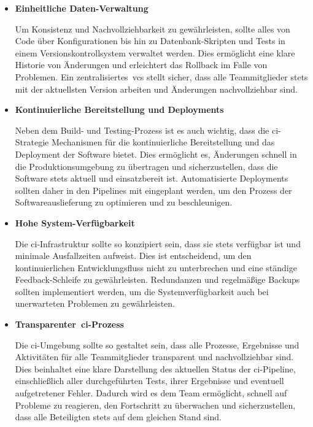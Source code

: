 \begin{itemize}
    \item {
        \textbf{Einheitliche Daten-Verwaltung}\par
        Um Konsistenz und Nachvollziehbarkeit zu gewährleisten, sollte alles von Code über Konfigurationen bis hin
        zu Datenbank-Skripten und Tests in einem Versionskontrollsystem verwaltet werden.
        Dies ermöglicht eine klare Historie von Änderungen und erleichtert das Rollback im Falle von Problemen.
        Ein zentralisiertes\ \acrshort{vcs} stellt sicher, dass alle Teammitglieder stets mit der aktuellsten Version
        arbeiten und Änderungen nachvollziehbar sind.
    }

    \item {
        \textbf{Kontinuierliche Bereitstellung und Deployments}\par
        Neben dem Build- und Testing-Prozess ist es auch wichtig, dass die \acrshort{ci}-Strategie Mechanismen für die
        kontinuierliche Bereitstellung und das Deployment der Software bietet.
        Dies ermöglicht es, Änderungen schnell in die Produktionsumgebung zu übertragen und sicherzustellen, dass die
        Software stets aktuell und einsatzbereit ist.
        Automatisierte Deployments sollten daher in den Pipelines mit eingeplant werden, um den Prozess der
        Softwareauslieferung zu optimieren und zu beschleunigen.
    }

    \item {
        \textbf{Hohe System-Verfügbarkeit}\par
        Die \acrshort{ci}-Infrastruktur sollte so konzipiert sein, dass sie stets verfügbar ist und minimale Ausfallzeiten
        aufweist. Dies ist entscheidend, um den kontinuierlichen Entwicklungsfluss nicht zu unterbrechen und eine
        ständige Feedback-Schleife zu gewährleisten.
        Redundanzen und regelmäßige Backups sollten implementiert werden, um die Systemverfügbarkeit auch bei
        unerwarteten Problemen zu gewährleisten.
    }

    \item {
        \textbf{Transparenter\ \acrshort{ci}-Prozess}\par
        Die \acrshort{ci}-Umgebung sollte so gestaltet sein, dass alle Prozesse, Ergebnisse und Aktivitäten für alle
        Teammitglieder transparent und nachvollziehbar sind.
        Dies beinhaltet eine klare Darstellung des aktuellen Status der \acrshort{ci}-Pipeline, einschließlich aller
        durchgeführten Tests, ihrer Ergebnisse und eventuell aufgetretener Fehler.
        Dadurch wird es dem Team ermöglicht, schnell auf Probleme zu reagieren, den Fortschritt zu überwachen und
        sicherzustellen, dass alle Beteiligten stets auf dem gleichen Stand sind.
    }
\end{itemize}

